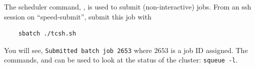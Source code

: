 \noindent The scheduler command, , is used to submit (non-interactive) jobs. 
From an ssh session on ``speed-submit'', submit this job with
\begin{verbatim}
    sbatch ./tcsh.sh
\end{verbatim}

\noindent You will see, \texttt{Submitted batch job 2653} where $2653$ is a job ID assigned.
The commands,  and  can be used 
to look at the status of the cluster: \texttt{squeue -l}.

